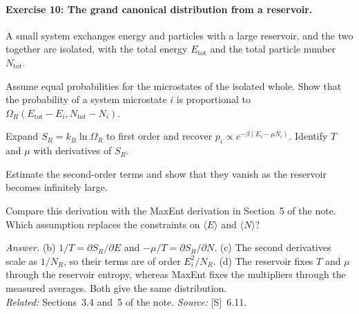 \documentclass[11pt]{article}      %
\numberwithin{equation}{section}   %
\begin{document}
\paragraph{Exercise 10: The grand canonical distribution from a reservoir.}
A small system exchanges energy and particles with a large reservoir, and the two together are isolated, with the total energy $E_{\text{tot}}$ and the total particle number $N_{\text{tot}}$.
\begin{parts}
    \item Assume equal probabilities for the microstates of the isolated whole. Show that the probability of a system microstate $i$ is proportional to $\Omega_R(E_{\text{tot}} - E_i, N_{\text{tot}} - N_i)$.
    \item Expand $S_R = k_B\ln\Omega_R$ to first order and recover $p_i \propto e^{-\beta(E_i - \mu N_i)}$. Identify $T$ and $\mu$ with derivatives of $S_R$.
    \item Estimate the second-order terms and show that they vanish as the reservoir becomes infinitely large.
    \item Compare this derivation with the MaxEnt derivation in Section~5 of the note. Which assumption replaces the constraints on $\langle E\rangle$ and $\langle N\rangle$?
\end{parts}
\textit{Answer.} (b) $1/T = \partial S_R/\partial E$ and $-\mu/T = \partial S_R/\partial N$. (c) The second derivatives scale as $1/N_R$, so their terms are of order $E_i^2/N_R$. (d) The reservoir fixes $T$ and $\mu$ through the reservoir entropy, whereas MaxEnt fixes the multipliers through the measured averages. Both give the same distribution.\\
\textit{Related:} Sections~3.4 and~5 of the note. \textit{Source:} [S]~6.11.
\end{document}
